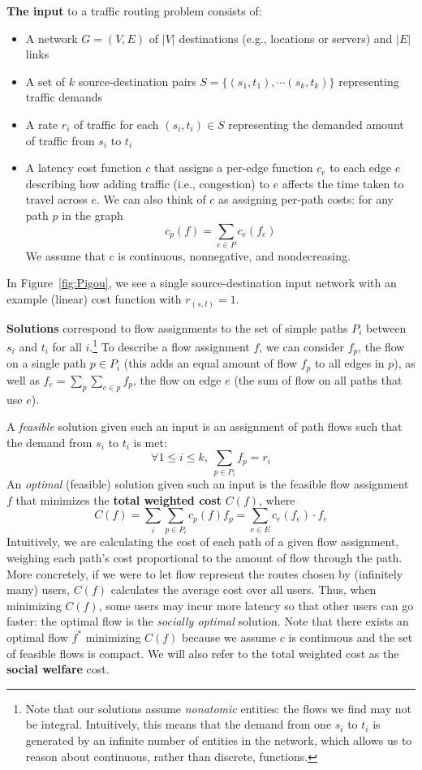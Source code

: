 \medskip\noindent
\textbf{The input} to a traffic routing problem consists of:
\begin{itemize}
    \item A network $G = (V, E)$ of $|V|$ destinations (e.g., locations or servers) and $|E|$ links 
     \item A set of $k$ source-destination pairs $S=\{(s_1,t_1), \cdots (s_k,t_k)\}$ representing traffic demands
    \item A {rate} $r_i$ of traffic for each $(s_i,t_i)\in S$ representing the demanded amount of traffic from $s_i$ to $t_i$
    \item A {latency} cost function $c$ that assigns a per-edge function $c_e$ to each edge $e$ describing how adding traffic (i.e., congestion) to $e$ affects the time taken to travel across $e$. We can also think of $c$ as assigning per-path costs: for any path $p$ in the graph
        $$c_p(f) = \sum_{e\in P}c_e(f_e)$$ 
        We assume that $c$ is continuous, nonnegative, and nondecreasing.
\end{itemize}
In Figure~\ref{fig:Pigou}, we see a single source-destination input network with an example (linear) cost function with $r_{(s,t)} = 1$.

\medskip\noindent
\textbf{Solutions} correspond to flow assignments to the set of simple paths $P_i$ between $s_i$ and $t_i$ for all $i$.\footnote{Note that our solutions assume \emph{nonatomic} entities: the flows we find may not be integral. 
Intuitively, this means that the demand from one $s_i$ to $t_i$ is generated by an infinite number
of entities in the network, which allows us to reason about continuous, rather than discrete, functions.}
%
To describe a flow assignment $f$, we can consider $f_p$, the flow on a single path $p \in P_i$ (this adds an equal amount of flow $f_p$ to all edges in $p$), as well as $f_e = \sum_p \sum_{e\in p} f_p$, the flow on edge $e$ (the sum of flow on all paths that use $e$).

A \emph{feasible} solution given such an input is an assignment of path flows such that the demand from $s_i$ to $t_i$ is met:
$$\forall 1 \le i \le k,~\sum_{p\in P_i} f_p = r_i$$
%
An \emph{optimal} (feasible) solution given such an input is the feasible flow assignment $f$ that minimizes the \textbf{total weighted cost} $C(f)$, where
$$C(f) = \sum_i\sum_{p\in P_i}c_p(f)f_p = \sum_{e\in E} c_e(f_e)\cdot f_e$$
Intuitively, we are calculating the cost of each path of a given flow assignment, weighing 
each path's cost proportional to the amount of flow through the path. More concretely,
if we were to let flow represent the routes chosen by (infinitely many) users, $C(f)$ calculates the average cost over all users. Thus, when minimizing $C(f)$, some users may incur 
more latency so that other users can go faster: the optimal flow is the \emph{socially optimal} solution.
Note that there exists an optimal flow $f^*$ minimizing $C(f)$ because we assume $c$ is continuous and the set of feasible flows is compact.
We will also refer to the total weighted cost as the \textbf{social welfare} cost.

